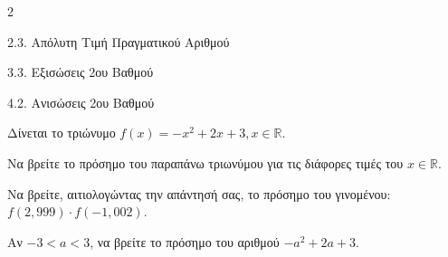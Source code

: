 \begin{ylh}{2}
    \item 2.3. Απόλυτη Τιμή Πραγματικού Αριθμού
    \item 3.3. Εξισώσεις 2ου Βαθμού
    \item 4.2. Ανισώσεις 2ου Βαθμού
\end{ylh}
Δίνεται το τριώνυμο $f(x) = -x^2 + 2x + 3, x \in \mathbb{R}$.

\begin{alist}
\item Να βρείτε το πρόσημο του παραπάνω τριωνύμου για τις διάφορες τιμές του $x \in \mathbb{R}$. 
\item Να βρείτε, αιτιολογώντας την απάντησή σας, το πρόσημο του γινομένου: $f(2,999) \cdot f(-1,002)$. 
\item Αν $-3 < a < 3$, να βρείτε το πρόσημο του αριθμού $-a^2 + 2a + 3$. 
\end{alist}

